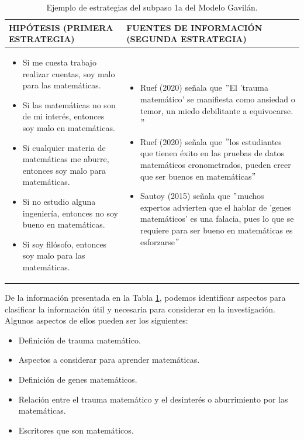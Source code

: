 \begin{table}[H]
  \begin{center}
    \begin{tabular}{ | p{8cm} | p{8cm} | }
      \hline
      HIPÓTESIS (PRIMERA ESTRATEGIA) & FUENTES DE INFORMACIÓN (SEGUNDA ESTRATEGIA) \\ \hline
      \begin{itemize}
        \item Si me cuesta trabajo realizar cuentas, soy malo para las matemáticas.
        \item Si las matemáticas no son de mi interés, entonces soy malo en matemáticas.
        \item Si cualquier materia de matemáticas me aburre, entonces soy malo para matemáticas.
        \item Si no estudio alguna ingeniería, entonces no soy bueno en matemáticas.
        \item Si soy filósofo, entonces soy malo para las matemáticas.
      \end{itemize} & 
      \begin{itemize}
        \item Ruef (2020) señala que $"$El 'trauma matemático' se manifiesta como ansiedad o temor, un miedo debilitante a equivocarse.$"$
        \item Ruef (2020) señala que $"$los estudiantes que tienen éxito en las pruebas de datos matemáticos cronometrados, pueden creer que ser buenos en matemáticas$"$
        \item Sautoy (2015) señala que $"$muchos expertos advierten que el hablar de 'genes matemáticos' es una falacia, pues lo que se requiere para ser bueno en matemáticas es esforzarse$"$
      \end{itemize} \\ \hline
    \end{tabular}
    \caption{Ejemplo de estrategias del subpaso 1a del Modelo Gavilán.}
    \label{tab:t1}
  \end{center}
\end{table}

De la información presentada en la Tabla \ref{tab:t1}, podemos identificar aspectos para clasificar la información útil y necesaria para considerar en la investigación. Algunos aspectos de ellos pueden ser los siguientes:

\begin{itemize}
  \item Definición de trauma matemático.
  \item Aspectos a considerar para aprender matemáticas.
  \item Definición de genes matemáticos.
  \item Relación entre el trauma matemático y el desinterés o aburrimiento por las matemáticas.
  \item Escritores que son matemáticos.
\end{itemize}

